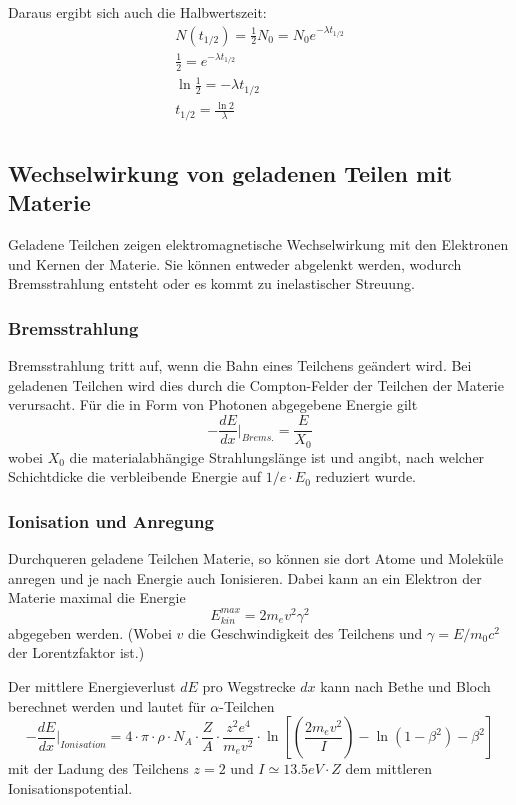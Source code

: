 Daraus ergibt sich auch die Halbwertszeit:
\begin{gather}
 N(t_{1/2}) = \frac{1}{2} N_0 = N_0 e^{-\lambda t_{1/2}} \\
 \frac{1}{2} = e^{-\lambda t_{1/2}} \\
 \ln \frac{1}{2} = - \lambda t_{1/2} \\
 t_{1/2} = \frac{\ln 2}{\lambda} \label{t12ln2lambda}\\
\end{gather}

\subsection{Wechselwirkung von geladenen Teilen mit Materie}

Geladene Teilchen zeigen elektromagnetische Wechselwirkung mit den Elektronen und Kernen der Materie. Sie können entweder abgelenkt werden, wodurch Bremsstrahlung entsteht oder es kommt zu inelastischer Streuung.

\subsubsection{Bremsstrahlung}
Bremsstrahlung tritt auf, wenn die Bahn eines Teilchens geändert wird. Bei geladenen Teilchen wird dies durch die Compton-Felder der Teilchen der Materie verursacht. Für die in Form von Photonen abgegebene Energie gilt
\begin{equation}
 - \frac{dE}{dx} \rvert_{Brems.} = \frac{E}{X_0}
\end{equation}
wobei $X_0$ die materialabhängige Strahlungslänge ist und angibt, nach welcher Schichtdicke die verbleibende Energie auf $1/e \cdot E_0$ reduziert wurde.

\subsubsection{Ionisation und Anregung}
Durchqueren geladene Teilchen Materie, so können sie dort Atome und Moleküle anregen und je nach Energie auch Ionisieren. Dabei kann an ein Elektron der Materie maximal die Energie
\begin{equation}
 E_{kin}^{max} = 2 m_e v^2 \gamma^2
\end{equation}
abgegeben werden. (Wobei $v$ die Geschwindigkeit des Teilchens und $\gamma = E / m_0 c^2$ der Lorentzfaktor ist.)

Der mittlere Energieverlust $dE$ pro Wegstrecke $dx$ kann nach Bethe und Bloch berechnet werden und lautet für $\alpha$-Teilchen
\begin{equation}
 - \frac{dE}{dx} \rvert_{Ionisation} = 4 \cdot \pi \cdot \rho \cdot N_A \cdot \frac{Z}{A} \cdot \frac{z^2e^4}{m_e v^2} \cdot \ln \left[ \left( \frac{2m_ev^2}{I} \right) - \ln \left( 1- \beta^2 \right) - \beta^2 \right]
\end{equation}
mit der Ladung des Teilchens $z = 2$ und $I \simeq 13.5 eV \cdot Z$ dem mittleren Ionisationspotential.

